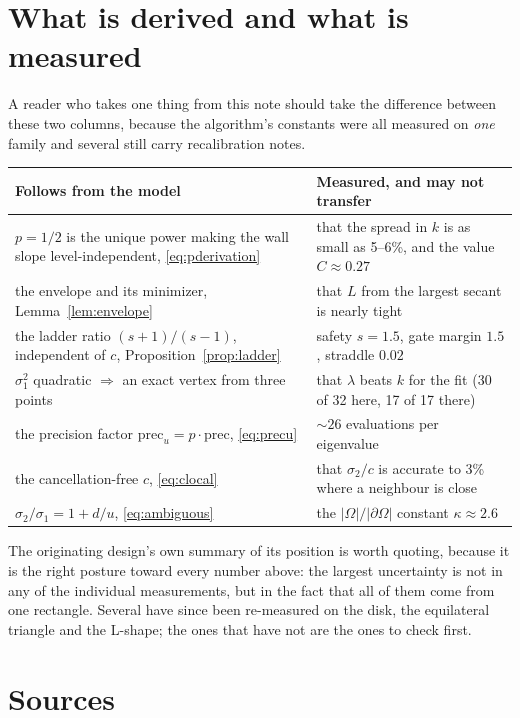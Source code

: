 \documentclass[11pt]{article}
\theoremstyle{definition}
\theoremstyle{remark}
\newcommand{\Om}{\Omega}
\newcommand{\lam}{\lambda}
\newcommand{\sig}{\sigma}
\newcommand{\pr}{\mathrm{prec}}
\newcommand{\abs}[1]{\left\lvert #1 \right\rvert}
\begin{document}
\section{What is derived and what is measured}

A reader who takes one thing from this note should take the difference between these two
columns, because the algorithm's constants were all measured on \emph{one} family and several
still carry recalibration notes.

\begin{center}
\begin{tabular}{P{0.46\textwidth}P{0.46\textwidth}}
\toprule
\textbf{Follows from the model} & \textbf{Measured, and may not transfer}\\
\midrule
$p=1/2$ is the unique power making the wall slope level-independent, \eqref{eq:pderivation} &
that the spread in $k$ is as small as 5--6\%, and the value $C\approx0.27$\\
the envelope and its minimizer, Lemma~\ref{lem:envelope} & that $L$ from the largest secant is
nearly tight\\
the ladder ratio $(s+1)/(s-1)$, independent of $c$, Proposition~\ref{prop:ladder} & safety
$s=1.5$, gate margin $1.5$, straddle $0.02$\\
$\sig_1^2$ quadratic $\Rightarrow$ an exact vertex from three points & that $\lam$ beats $k$
for the fit (30 of 32 here, 17 of 17 there)\\
the precision factor $\pr_u=p\cdot\pr$, \eqref{eq:precu} & ${\sim}26$ evaluations per
eigenvalue\\
the cancellation-free $c$, \eqref{eq:clocal} & that $\sig_2/c$ is accurate to 3\% where a neighbour is close\\
$\sig_2/\sig_1 = 1+d/u$, \eqref{eq:ambiguous} & the $\abs{\Om}/\abs{\partial\Om}$ constant
$\kappa\approx2.6$\\
\bottomrule
\end{tabular}
\end{center}

The originating design's own summary of its position is worth quoting, because it is the right
posture toward every number above: the largest uncertainty is not in any of the individual
measurements, but in the fact that all of them come from one rectangle. Several have since been
re-measured on the disk, the equilateral triangle and the L-shape; the ones that have not are
the ones to check first.

\section*{Sources}
\end{document}
